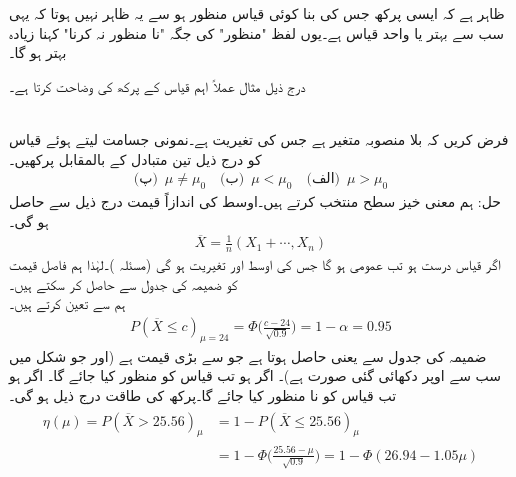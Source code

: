 ظاہر ہے کہ ایسی پرکھ جس کی بنا کوئی قیاس  منظور ہو سے یہ ظاہر نہیں ہوتا کہ یہی سب سے بہتر  یا واحد قیاس ہے۔یوں لفظ "منظور" کی جگہ "نا منظور نہ کرنا" کہنا زیادہ بہتر ہو گا۔ 

درج ذیل مثال عملاً اہم قیاس کے پرکھ کی وضاحت کرتا ہے۔ 

\quad {}\\
فرض کریں کہ  بلا منصوبہ متغیر ہے جس کی تغیریت  ہے۔نمونی جسامت  لیتے ہوئے قیاس  کو درج ذیل تین متبادل کے بالمقابل پرکھیں۔
\begin{align*}
\text{(پ)}\,\,\, \mu \ne \mu_0 \quad \text{(ب)}\,\,\, \mu<\mu_0 \quad \text{(الف)}\,\,\,  \mu>\mu_0
\end{align*}
حل:\quad
ہم معنی خیز سطح  منتخب کرتے ہیں۔اوسط کی اندازاً قیمت درج ذیل سے حاصل ہو گی۔
\begin{align*}
\overline{X}=\frac{1}{n}(X_1+\cdots,X_n)
\end{align*}
اگر قیاس درست ہو تب  عمومی ہو گا جس کی اوسط  اور تغیریت  ہو گی (مسئلہ )۔لہٰذا ہم فاصل قیمت  کو ضمیمہ  کی جدول  سے حاصل کر سکتے ہیں۔\\
\quad
ہم  سے  تعین کرتے ہیں۔
\begin{align*}
P(\overline{X}\le c)_{\mu=24}=\Phi\big(\frac{c-24}{\sqrt{0.9}}\big)=1-\alpha=0.95
\end{align*}
ضمیمہ  کی جدول   سے  یعنی  حاصل ہوتا ہے جو  سے بڑی قیمت ہے (اور جو شکل  میں سب سے اوپر دکھائی گئی صورت ہے)۔ اگر  ہو تب قیاس کو منظور کیا جائے گا۔ اگر  ہو تب قیاس کو نا منظور کیا جائے گا۔پرکھ کی طاقت درج ذیل ہو گی۔
\begin{gather}
\begin{aligned}
\eta(\mu)=P(\overline{X}>25.56)_{\mu}&=1-P(\overline{X}\le 25.56)_{\mu}\\
&=1-\Phi\big(\frac{25.56-\mu}{\sqrt{0.9}}\big)=1-\Phi(26.94-1.05\mu)
\end{aligned}
\end{gather}
